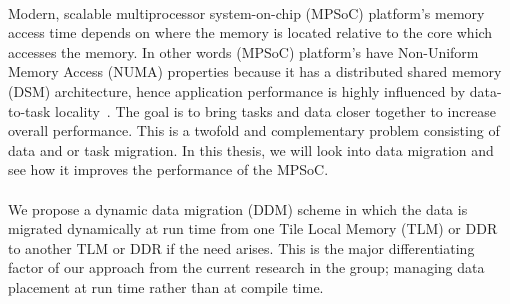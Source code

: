 \documentclass{listhesis}
\begin{document}
\\
Modern, scalable multiprocessor system-on-chip (MPSoC) platform's memory access time depends on where the memory is located relative to the core which accesses the memory. In other words (MPSoC) platform's have Non-Uniform Memory Access (NUMA) properties because it has a distributed shared memory (DSM) architecture, hence application performance is highly influenced by data-to-task locality~\cite{sven, lispaper}. The goal is to bring tasks and data closer together to increase overall performance. This is a twofold and complementary problem consisting of data and or task migration. In this thesis, we will look into data migration and see how it improves the performance of the MPSoC.\\
\\
We propose a dynamic data migration (DDM) scheme in which the data is migrated dynamically at run time from one Tile Local Memory (TLM) or DDR to another TLM or DDR if the need arises. This is the major differentiating factor of our approach from the current research in the group; managing data placement at run time rather than at compile time.
\end{document}

